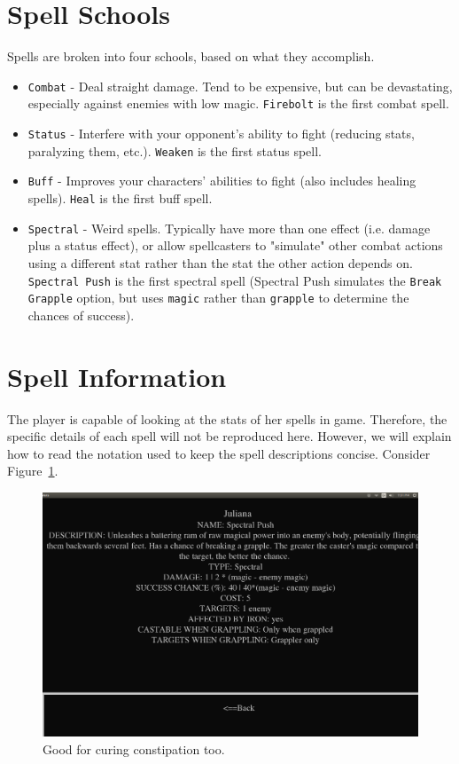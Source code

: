 \documentclass{report}
\begin{document}
\section{Spell Schools}
\label{sec_schools}
Spells are broken into four schools, based on what they accomplish.
\begin{itemize}
    \item \verb|Combat| - Deal straight damage. Tend to be expensive, but can be devastating, especially against enemies with low magic. \verb|Firebolt| is the first 
    combat spell.
    \item \verb|Status| - Interfere with your opponent's ability to fight (reducing stats, paralyzing them, etc.). \verb|Weaken| is the first status spell.
    \item \verb|Buff| - Improves your characters' abilities to fight (also includes healing spells). \verb|Heal| is the first buff spell.
    \item \verb|Spectral| - Weird spells. Typically have more than one effect (i.e. damage plus a status effect), or allow spellcasters to "simulate" other combat actions using a different stat rather than the stat the other action depends on. \verb|Spectral Push| is the first spectral spell (Spectral Push simulates the \verb|Break Grapple| 
    option, but uses \verb|magic| rather than \verb|grapple| to determine the chances of success).
\end{itemize}

\section{Spell Information}

The player is capable of looking at the stats of her spells in game. Therefore, the specific details of each spell will not be reproduced here. However, we will explain
how to read the notation used to keep the spell descriptions concise. Consider Figure~\ref{fig_spell}.

\begin{figure}[h!]
    \includegraphics[width=\textwidth]{spell}
    \caption{Good for curing constipation too.}
    \label{fig_spell}
\end{figure}
\end{document}
